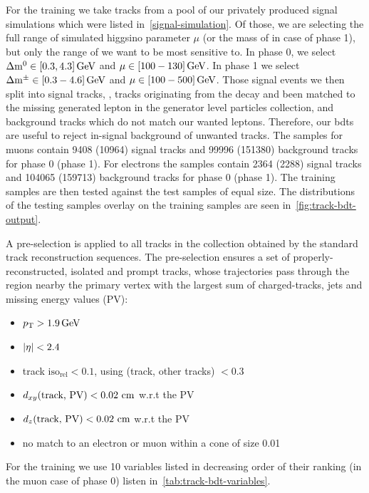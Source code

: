For the training we take tracks from a pool of our privately produced \FASTSIM signal simulations which were listed in~\ref{signal-simulation}. Of those, we are selecting the full range of simulated higgsino parameter $\mu$ (or the mass of \PSGcpmDo in case of phase 1), but only the range of \dm we want to be most sensitive to. In phase 0, we select $\Delta\mathrm{m}^0\in [0.3,4.3]\,\text{Ge\hspace{-.08em}V}$ and $\mu\in [100-130]\,\text{Ge\hspace{-.08em}V}$. In phase 1 we select $\Delta\mathrm{m}^\pm \in [0.3-4.6]\,\text{Ge\hspace{-.08em}V}$ and $\mu\in [100-500]\,\text{Ge\hspace{-.08em}V}$. Those signal events we then split into signal tracks, \ie, tracks originating from the decay \neuttdecay and been matched to the missing generated lepton in the generator level particles collection, and background tracks which do not match our wanted leptons. Therefore, our \glspl{bdt} are useful to reject in-signal background of unwanted tracks. The samples for muons contain 9408 (10964) signal tracks and 99996 (151380) background tracks for phase 0 (phase 1). For electrons the samples contain 2364 (2288) signal tracks and 104065 (159713) background tracks for phase 0 (phase 1). The training samples are then tested against the test samples of equal size. The distributions of the testing samples overlay on the training samples are seen in~\ref{fig:track-bdt-output}.

A pre-selection is applied to all tracks in the collection obtained by the standard track reconstruction sequences. The pre-selection ensures a set of properly-reconstructed, isolated and prompt tracks, whose trajectories pass through the region nearby the primary vertex with the largest sum of charged-tracks, jets and missing energy values (PV): 

\begin{itemize}
\item $ p_{\mathrm{T}} > 1.9 \,\text{Ge\hspace{-.08em}V}$
\item $ \lvert \eta \rvert < 2.4$
\item track $\text{iso}_\text{rel}  < 0.1$, using \DR(track, other tracks) $< 0.3$
\item $d_{xy}(\text{track, PV}) < 0.02\, \,\text{cm}$ w.r.t the PV
\item $d_z(\text{track, PV}) < 0.02\, \,\text{cm}$ w.r.t the PV
\item no match to an electron or muon within a cone of size 0.01
\end{itemize}

For the training we use 10 variables listed in decreasing order of their ranking (in the muon case of phase 0) listen in~\ref{tab:track-bdt-variables}.

